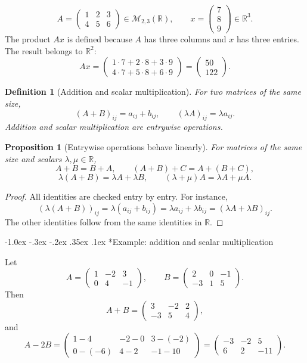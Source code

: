 \documentclass[10pt]{article}
\makeatletter
\renewcommand\subsection{\@startsection{subsection}{2}{\z@}%
  {-1.0ex \@plus -.3ex \@minus -.2ex}%
  {.35ex \@plus .1ex}%
  {\normalfont\normalsize\bfseries}}
\theoremstyle{compactdefinition}
\newtheorem{definition}{Definition}[section]
\theoremstyle{compactproposition}
\newtheorem{proposition}{Proposition}[section]
\newcommand{\R}{\mathbb{R}}
\newcommand{\M}{\mathcal{M}}
\makeatother
\begin{document}
\[
A=
\begin{pmatrix}
1&2&3\\
4&5&6
\end{pmatrix}
\in \M_{2,3}(\R),
\qquad
x=
\begin{pmatrix}
7\\8\\9
\end{pmatrix}
\in \R^3.
\]
The product $Ax$ is defined because $A$ has three columns and $x$ has three
entries. The result belongs to $\R^2$:
\[
Ax=
\begin{pmatrix}
1\cdot7+2\cdot8+3\cdot9\\
4\cdot7+5\cdot8+6\cdot9
\end{pmatrix}
=
\begin{pmatrix}
50\\122
\end{pmatrix}.
\]

\begin{definition}[Addition and scalar multiplication]
For two matrices of the same size,
\[
(A+B)_{ij}=a_{ij}+b_{ij},
\qquad
(\lambda A)_{ij}=\lambda a_{ij}.
\]
Addition and scalar multiplication are entrywise operations.
\end{definition}

\begin{proposition}[Entrywise operations behave linearly]
For matrices of the same size and scalars $\lambda,\mu\in\R$,
\[
A+B=B+A,\qquad (A+B)+C=A+(B+C),
\]
\[
\lambda(A+B)=\lambda A+\lambda B,\qquad
(\lambda+\mu)A=\lambda A+\mu A.
\]
\end{proposition}

\begin{proof}
All identities are checked entry by entry. For instance,
\[
(\lambda(A+B))_{ij}=\lambda(a_{ij}+b_{ij})
=\lambda a_{ij}+\lambda b_{ij}
=(\lambda A+\lambda B)_{ij}.
\]
The other identities follow from the same identities in $\R$.
\end{proof}

\subsection*{Example: addition and scalar multiplication}

Let
\[
A=\begin{pmatrix}1&-2&3\\0&4&-1\end{pmatrix},
\qquad
B=\begin{pmatrix}2&0&-1\\-3&1&5\end{pmatrix}.
\]
Then
\[
A+B=
\begin{pmatrix}
3&-2&2\\
-3&5&4
\end{pmatrix},
\]
and
\[
A-2B=
\begin{pmatrix}
1-4 & -2-0 & 3-(-2)\\
0-(-6) & 4-2 & -1-10
\end{pmatrix}
=
\begin{pmatrix}
-3&-2&5\\
6&2&-11
\end{pmatrix}.
\]
\end{document}
